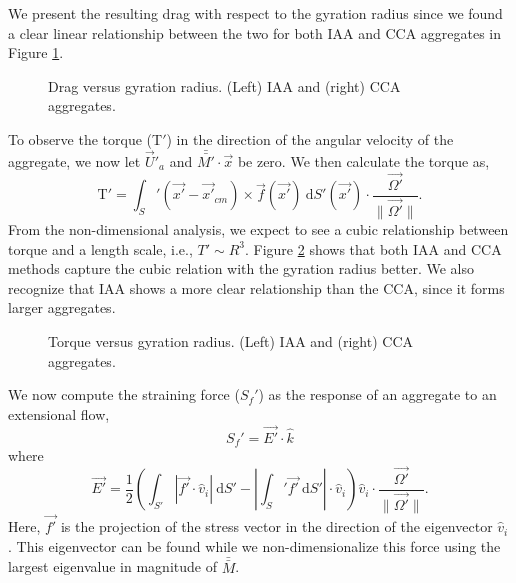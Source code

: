  We present the resulting drag with respect to the gyration radius since we found a clear linear relationship between the two for both IAA and CCA aggregates in Figure \ref{fig_drag}. 
 \begin{figure}[h]
 \begin{center}
 \end{center}
 \caption{Drag versus gyration radius. (Left) IAA and (right) CCA aggregates.}
 \label{fig_drag}
 \end{figure}
\par
To observe the torque (T$'$) in the direction of the angular velocity of the aggregate, we now let $\vec{U}'_a$ and $\bar{\bar{M'}}\cdot \vec{x}$ be zero. 
We then calculate the torque as,
\begin{equation}
\text{T}' = 
\int_S' \left( \vec{x'} - \vec{x'}_{cm}  \right) \times \vec{f}(\vec{x'}) \ \text{d}S' (\vec{x'})
 \cdot \frac{\vec{\Omega'}}{\|\vec{\Omega'}\|}.
 \end{equation}
\newline
From the non-dimensional analysis, we expect to see a cubic relationship between torque and a length scale, i.e., $T' \sim R^3$. Figure \ref{fig_torque} shows that both IAA and CCA methods capture the cubic relation with the gyration radius better. We also recognize that IAA shows a more clear relationship than the CCA, since it forms larger aggregates. 
 \begin{figure}[h]
 \begin{center}
 \end{center}
 \caption{Torque versus gyration radius. (Left) IAA and (right) CCA aggregates.}
 \label{fig_torque}
 \end{figure}
\par
We now compute the straining force ($S_f'$) as the response of an aggregate to an extensional flow,
\begin{equation}
S_f' = \vec{E'} \cdot \hat{k}
\end{equation}
where
\begin{equation}
\vec{E'} = \frac{1}{2} \left( 
\int_{S'} \left|\vec{f'} \cdot \hat{v}_i \right| \ \text{d}S'-
\left| \int_S' \vec{f'} \ \text{d} S' \right|\cdot \hat{v}_i
 \right)  \hat{v}_i
 \cdot \frac{\vec{\Omega'}}{\|\vec{\Omega'}\|}.
\end{equation}
Here,  $\vec{f'}$ is the projection of the stress vector in the direction of the eigenvector $\hat{v}_i$.
This eigenvector can be found while we non-dimensionalize this force using the largest eigenvalue in magnitude of $\bar{ \bar{M} }$.
